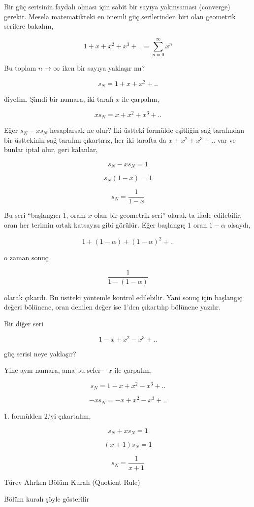 \documentclass[12pt,fleqn]{article}\usepackage{../../common}
\begin{document}
Bir güç serisinin faydalı olması için sabit bir sayıya yakınsaması
(converge) gerekir. Mesela matematikteki en önemli güç serilerinden biri
olan geometrik serilere bakalım, 

$$ 1 + x + x^2 + x^3 + .. = \sum _{n=0}^{\infty} x^n  $$

Bu toplam $n \to \infty$ iken bir sayıya yaklaşır mı? 

$$ s_N = 1 + x + x^2 + ..  $$

diyelim. Şimdi bir numara, iki tarafı $x$ ile çarpalım, 

$$ x s_N = x + x^2 + x^3 + ..  $$

Eğer $s_N - xs_N$ hesaplarsak ne olur? İki üstteki formülde eşitliğin sağ
tarafından bir üsttekinin sağ tarafını çıkartırız, her iki tarafta da $x +
x^2 + x^3 + ..$ var ve bunlar iptal olur, geri kalanlar, 

$$ s_N - xs_N = 1  $$

$$ s_N(1-x) = 1 $$

$$ s_N = \frac{1}{1-x} $$

Bu seri ``başlangıcı 1, oranı $x$ olan bir geometrik seri'' olarak ta ifade
edilebilir, oran her terimin ortak katsayısı gibi görülür. Eğer başlangıç 1
oran $1-\alpha$ olsaydı,

$$ 1 + (1-\alpha) + (1-\alpha)^2 + .. $$

o zaman sonuç

$$ \frac{1}{1 - (1-\alpha)} $$

olarak çıkardı. Bu üstteki yöntemle kontrol edilebilir. Yani sonuç için
başlangıç değeri bölünene, oran denilen değer ise 1'den çıkartılıp
bölünene yazılır.

Bir diğer seri

$$ 1 - x + x^2 - x^3 + .. $$

güç serisi neye yaklaşır? 

Yine aynı numara, ama bu sefer $-x$ ile çarpalım,

$$ s_N  = 1 - x + x^2 - x^3 + .. $$

$$ -x s_N = -x + x^2 - x^3 + .. $$

1. formülden 2.'yi çıkartalım, 

$$ s_N + x s_N = 1$$

$$ (x+1)s_N  = 1$$

$$ s_N  = \frac{1}{x+1} $$

\newpage

Türev Alırken Bölüm Kuralı (Quotient Rule)

Bölüm kuralı şöyle gösterilir 
\end{document}

